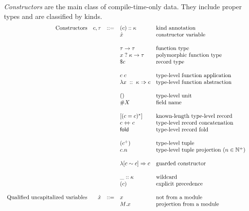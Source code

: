 \documentclass{article}
\newcommand{\mt}[1]{\mathsf{#1}}
\newcommand{\rc}{+ \hspace{-.075in} + \;}
\begin{document}
\emph{Constructors} are the main class of compile-time-only data.  They include proper types and are classified by kinds.
$$\begin{array}{rrcll}
  \textrm{Constructors} & c, \tau &::=& (c) :: \kappa & \textrm{kind annotation} \\
  &&& \hat{x} & \textrm{constructor variable} \\
  \\
  &&& \tau \to \tau & \textrm{function type} \\
  &&& x \; ? \; \kappa \to \tau & \textrm{polymorphic function type} \\
  &&& \$ c & \textrm{record type} \\
  \\
  &&& c \; c & \textrm{type-level function application} \\
  &&& \lambda x \; :: \; \kappa \Rightarrow c & \textrm{type-level function abstraction} \\
  \\
  &&& () & \textrm{type-level unit} \\
  &&& \#X & \textrm{field name} \\
  \\
  &&& [(c = c)^*] & \textrm{known-length type-level record} \\
  &&& c \rc c & \textrm{type-level record concatenation} \\
  &&& \mt{fold} & \textrm{type-level record fold} \\
  \\
  &&& (c^+) & \textrm{type-level tuple} \\
  &&& c.n & \textrm{type-level tuple projection ($n \in \mathbb N^+$)} \\
  \\
  &&& \lambda [c \sim c] \Rightarrow c & \textrm{guarded constructor} \\
  \\
  &&& \_ :: \kappa & \textrm{wildcard} \\
  &&& (c) & \textrm{explicit precedence} \\
  \\
  \textrm{Qualified uncapitalized variables} & \hat{x} &::=& x & \textrm{not from a module} \\
  &&& M.x & \textrm{projection from a module} \\
\end{array}$$
\end{document}
